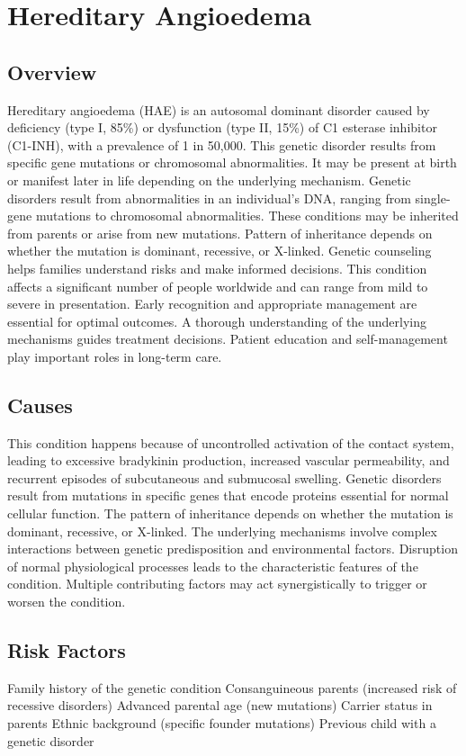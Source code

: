 \chapter{Hereditary Angioedema}
\label{sec:Hereditary Angioedema}

\section{Overview}
Hereditary angioedema (HAE) is an autosomal dominant disorder caused by deficiency (type I, 85\%) or dysfunction (type II, 15\%) of C1 esterase inhibitor (C1-INH), with a prevalence of 1 in 50,000. This genetic disorder results from specific gene mutations or chromosomal abnormalities. It may be present at birth or manifest later in life depending on the underlying mechanism. Genetic disorders result from abnormalities in an individual's DNA, ranging from single-gene mutations to chromosomal abnormalities. These conditions may be inherited from parents or arise from new mutations. Pattern of inheritance depends on whether the mutation is dominant, recessive, or X-linked. Genetic counseling helps families understand risks and make informed decisions. This condition affects a significant number of people worldwide and can range from mild to severe in presentation. Early recognition and appropriate management are essential for optimal outcomes. A thorough understanding of the underlying mechanisms guides treatment decisions. Patient education and self-management play important roles in long-term care.
\section{Causes}
This condition happens because of uncontrolled activation of the contact system, leading to excessive bradykinin production, increased vascular permeability, and recurrent episodes of subcutaneous and submucosal swelling. Genetic disorders result from mutations in specific genes that encode proteins essential for normal cellular function. The pattern of inheritance depends on whether the mutation is dominant, recessive, or X-linked. The underlying mechanisms involve complex interactions between genetic predisposition and environmental factors. Disruption of normal physiological processes leads to the characteristic features of the condition. Multiple contributing factors may act synergistically to trigger or worsen the condition.
\section{Risk Factors}
Family history of the genetic condition Consanguineous parents (increased risk of recessive disorders) Advanced parental age (new mutations) Carrier status in parents Ethnic background (specific founder mutations) Previous child with a genetic disorder

